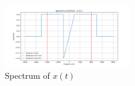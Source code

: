 
\item[(b)]
\begin{figure}[h]
    \centering
    \includegraphics[width=0.49\textwidth]{fig/ex2_b_plot}
    \caption{Spectrum of \(x(t)\)}
    \label{fig:ex2_b_plot}
\end{figure}
